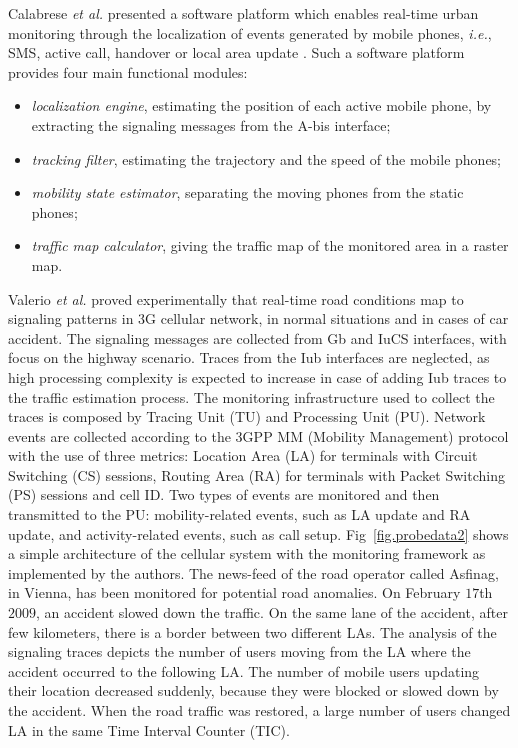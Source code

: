 \documentclass[10pt,onecolumn]{article}
\begin{document}
Calabrese \textit{et al.} presented a software platform which enables real-time urban monitoring through the localization of events generated by mobile phones, \textit{i.e.}, SMS, active call, handover or local area update \cite{Calabrese2011}. Such a software platform provides four main functional modules: 
\begin{itemize}
\item \textit{localization engine}, estimating the position of each active mobile phone, by extracting the signaling messages from the A-bis interface;
\item \textit{tracking filter}, estimating the trajectory and the speed of the mobile phones; 
\item \textit{mobility state estimator}, separating the moving phones from the static phones; 
\item \textit{traffic map calculator}, giving the traffic map of the monitored area in a raster map.
\end{itemize}

Valerio \textit{et al.} \cite{Valerio2009} proved experimentally that real-time road conditions map to signaling patterns in $3$G cellular network, in normal situations and in cases of car accident. 
The signaling messages are collected from Gb and IuCS interfaces, with focus on the highway scenario. 
Traces from the Iub interfaces are neglected, as high processing complexity is expected to increase in case of adding Iub traces to the traffic estimation process. 
The monitoring infrastructure used to collect the traces is composed by Tracing Unit (TU) and Processing Unit (PU). 
Network events are collected according to the 3GPP MM (Mobility Management) protocol with the use of three metrics: Location Area (LA) for terminals with Circuit Switching (CS) sessions, Routing Area (RA) for terminals with Packet Switching (PS) sessions and cell ID. Two types of events are monitored and then transmitted to the PU:
mobility-related events, such as LA update and RA update, and activity-related events, such as call setup. Fig~\ref{fig.probedata2} shows a simple architecture of the cellular system with the monitoring framework as implemented by the authors.
The news-feed of the road operator called Asfinag, in Vienna, has been monitored for potential road anomalies. On February $17$th $2009$, an accident slowed down the traffic. On the same lane of the accident, after few kilometers, there is a border between two different LAs. The analysis of the signaling traces depicts the number of users moving from the LA where the accident occurred to the following LA. The number of mobile users updating their location decreased suddenly, because they were blocked or slowed down by the accident. When the road traffic was restored, a large number of users changed LA in the same Time Interval Counter (TIC). 
\end{document}
